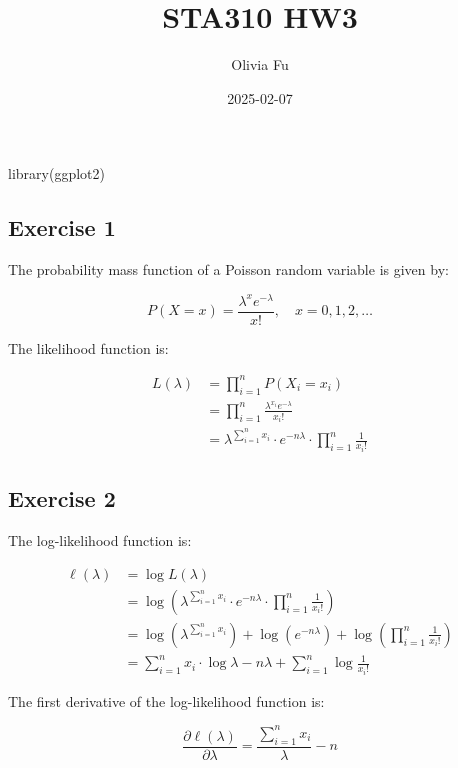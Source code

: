 \documentclass[
  letterpaper,
  DIV=11,
  numbers=noendperiod]{scrartcl}
\title{STA310 HW3}
\author{Olivia Fu}
\date{2025-02-07}
\newenvironment{Shaded}{\begin{snugshade}}{\end{snugshade}}
\newcommand{\FunctionTok}[1]{\textcolor[rgb]{0.28,0.35,0.67}{#1}}
\newcommand{\NormalTok}[1]{\textcolor[rgb]{0.00,0.23,0.31}{#1}}
\begin{document}
\maketitle

\begin{Shaded}
\begin{Highlighting}[]
\FunctionTok{library}\NormalTok{(ggplot2)}
\end{Highlighting}
\end{Shaded}

\subsection{Exercise 1}\label{exercise-1}

The probability mass function of a Poisson random variable is given by:

\[
P(X = x) = \frac{\lambda^x e^{-\lambda}}{x!}, \quad x = 0, 1, 2, \dots
\]

The likelihood function is:

\[
\begin{aligned}L(\lambda) &= \prod_{i=1}^n P(X_i = x_i)\\&= \prod_{i=1}^n \frac{\lambda^{x_i} e^{-\lambda}}{x_i!}\\&= \lambda^{\sum_{i=1}^n x_i} \cdot e^{-n\lambda} \cdot \prod_{i=1}^n \frac{1}{x_i!}\end{aligned}
\]

\clearpage

\subsection{Exercise 2}\label{exercise-2}

The log-likelihood function is:

\[
\begin{aligned}\ell(\lambda) &= \log L(\lambda) \\&=\log \left( \lambda^{\sum_{i=1}^n x_i}\cdot e^{-n\lambda} \cdot \prod_{i=1}^n \frac{1}{x_i!} \right)\\&= \log(\lambda^{\sum_{i=1}^n x_i}) + \log(e^{-n\lambda}) + \log(\prod_{i=1}^n \frac{1}{x_i!})\\&= \sum_{i=1}^n x_i \cdot \log \lambda - n\lambda + \sum_{i=1}^n \log \frac{1}{x_i!}\end{aligned}
\]

The first derivative of the log-likelihood function is:

\[
\frac{\partial \ell(\lambda)}{\partial \lambda} = \frac{\sum_{i=1}^n x_i}{\lambda} - n
\]
\end{document}

